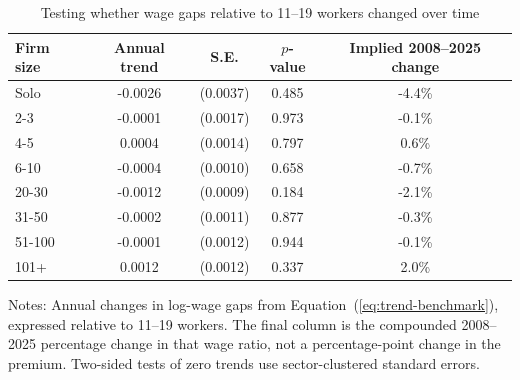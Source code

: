 \begin{table}[htbp]
  \centering
  \caption{Testing whether wage gaps relative to 11--19 workers changed over time}
  \label{tab:firm-size-premium-trend-test-11-19-reference}
  \small
  \begin{tabular}{lcccc}
    \toprule
    Firm size & Annual trend & S.E. & $p$-value & Implied 2008--2025 change \\
    \midrule
    Solo & -0.0026 & (0.0037) & 0.485 & -4.4\% \\
    2-3 & -0.0001 & (0.0017) & 0.973 & -0.1\% \\
    4-5 & 0.0004 & (0.0014) & 0.797 & 0.6\% \\
    6-10 & -0.0004 & (0.0010) & 0.658 & -0.7\% \\
    20-30 & -0.0012 & (0.0009) & 0.184 & -2.1\% \\
    31-50 & -0.0002 & (0.0011) & 0.877 & -0.3\% \\
    51-100 & -0.0001 & (0.0012) & 0.944 & -0.1\% \\
    101+ & 0.0012 & (0.0012) & 0.337 & 2.0\% \\
    \bottomrule
  \end{tabular}
  \vspace{0.3em}
  \begin{minipage}{0.95\textwidth}
  \footnotesize
  Notes: Annual changes in log-wage gaps from Equation~(\ref{eq:trend-benchmark}), expressed relative to 11--19 workers. The final column is the compounded 2008--2025 percentage change in that wage ratio, not a percentage-point change in the premium. Two-sided tests of zero trends use sector-clustered standard errors.
  \end{minipage}
\end{table}
